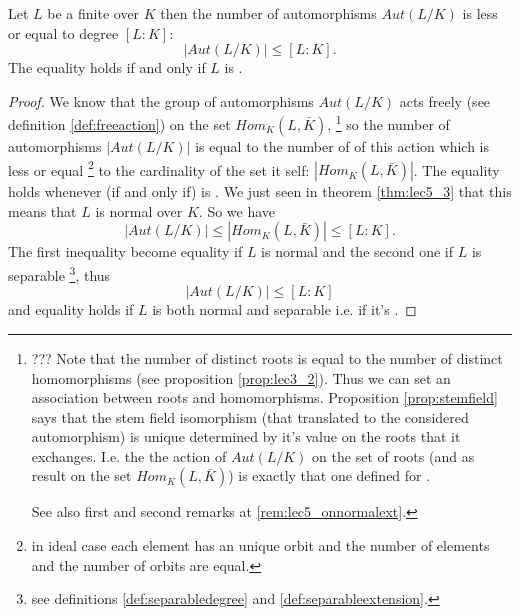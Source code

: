 \begin{theorem}
  Let $L$ be a finite over $K$ then the number of automorphisms
  $Aut\left(L/K\right)$ is less or equal to degree
  $\left[L:K\right]$:
  \[
  \left|Aut\left(L/K\right)\right| \le \left[L:K\right].
  \]
  The equality holds if and only if $L$ is
  .
  \begin{proof}
    We know that the group of automorphisms $Aut\left(L/K\right)$ acts
    freely (see definition \ref{def:freeaction}) on the set
    $Hom_K\left(L, \bar{K}\right)$,
    \footnote{
      ??? Note that the number of distinct roots is equal to the number of
      distinct homomorphisms (see proposition \ref{prop:lec3_2}). Thus
      we can set an association between 
      roots and homomorphisms. Proposition \ref{prop:stemfield}
      says that the stem 
      field isomorphism (that translated to the considered
      automorphism) is unique determined by it's value on the roots that
      it exchanges. I.e. the the action of $Aut\left(L/K\right)$ on
      the set of roots (and as result on the set $Hom_K\left(L,
      \bar{K}\right)$) is exactly that one defined for 
      .

      See also first and second remarks at \ref{rem:lec5_onnormalext}.
    }
    so the number of 
    automorphisms $\left|Aut\left(L/K\right)\right|$ is equal to the
    number of  of this action which is less or
    equal
    \footnote{
      in ideal case each element has an unique orbit and the number of
      elements and the number of orbits are equal.
    }
    to the cardinality of the set it self:
    $\left|Hom_K\left(L, \bar{K}\right)\right|$. The equality holds
    whenever (if and only if)  is . We
    just seen in 
    theorem \ref{thm:lec5_3} that this means that $L$ is normal over
    $K$. So we have
    \[
    \left|Aut\left(L/K\right)\right| \le
    \left|Hom_K\left(L, \bar{K}\right)\right| \le
    \left[L:K\right].
    \]
    The first inequality become equality if $L$ is normal and the
    second one if $L$ is separable
    \footnote{
      see definitions \ref{def:separabledegree} and \ref{def:separableextension}.
    }, thus
    \[
    \left|Aut\left(L/K\right)\right| \le \left[L:K\right]
    \]
    and equality holds if $L$ is both normal and separable i.e. if
    it's .
  \end{proof}
  \label{thm:lec5_4}
\end{theorem}

